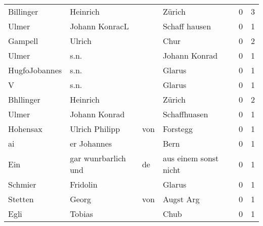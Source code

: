 \begin{tabular}{llllrr}
                Billinger &                           Heinrich &             &                                      Zürich &          0 &         3 \\
                    Ulmer &                     Johann KonracL &             &                               Schaff hausen &          0 &         1 \\
                  Gampell &                             Ulrich &             &                                        Chur &          0 &         2 \\
                    Ulmer &                               s.n. &             &                               Johann Konrad &          0 &         1 \\
            HugfoJobannes &                               s.n. &             &                                      Glarus &          0 &         1 \\
                        V &                               s.n. &             &                                      Glarus &          0 &         1 \\
                Bhllinger &                           Heinrich &             &                                      Zürich &          0 &         2 \\
                    Ulmer &                      Johann Konrad &             &                                Schaffhuasen &          0 &         1 \\
                 Hohensax &                     Ulrich Philipp &         von &                                    Forstegg &          0 &         1 \\
                       ai &                        er Johannes &             &                                        Bern &          0 &         1 \\
                      Ein &                gar wunrbarlich und &          de &                       aus einem sonst nicht &          0 &         1 \\
                  Schmier &                           Fridolin &             &                                      Glarus &          0 &         1 \\
                  Stetten &                              Georg &         von &                                   Augst Arg &          0 &         1 \\
                     Egli &                             Tobias &             &                                        Chub &          0 &         1 \\

\end{tabular}
